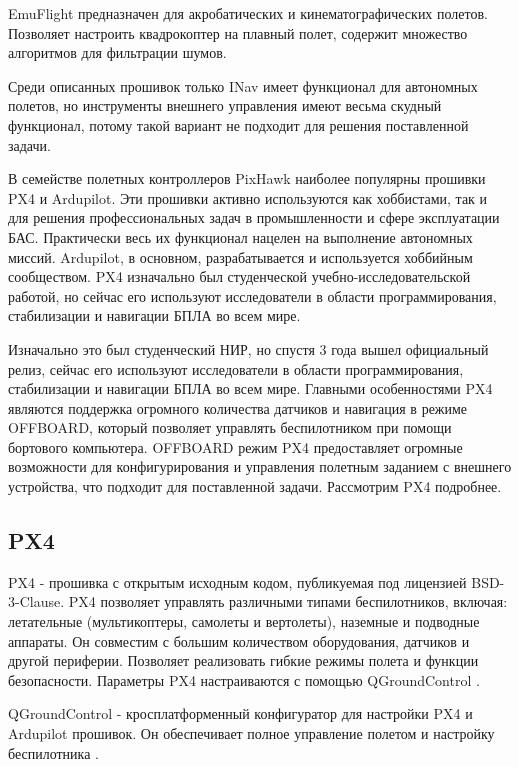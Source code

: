 EmuFlight предназначен для акробатических и кинематографических полетов. Позволяет настроить квадрокоптер на плавный полет, содержит множество алгоритмов для фильтрации шумов.

Среди описанных прошивок только INav имеет функционал для автономных полетов, но инструменты внешнего управления имеют весьма скудный функционал, потому такой вариант не подходит для решения поставленной задачи.

В семействе полетных контроллеров PixHawk наиболее популярны прошивки PX4 и Ardupilot. Эти прошивки активно используются как хоббистами, так и для решения профессиональных задач в промышленности и сфере эксплуатации БАС. Практически весь их функционал нацелен на выполнение автономных миссий. Ardupilot, в основном, разрабатывается и используется хоббийным сообществом. PX4 изначально был студенческой учебно-исследовательской работой, но сейчас его используют исследователи в области программирования, стабилизации и навигации БПЛА во всем мире.

Изначально это был студенческий НИР, но спустя 3 года вышел официальный релиз, сейчас его используют исследователи в области программирования, стабилизации и навигации БПЛА во всем мире. Главными особенностями PX4 являются поддержка огромного количества датчиков и навигация в режиме OFFBOARD, который позволяет управлять беспилотником при помощи бортового компьютера. OFFBOARD режим PX4 предоставляет огромные возможности для конфигурирования и управления полетным заданием с внешнего устройства, что подходит для поставленной задачи. Рассмотрим PX4 подробнее.

\subsection{PX4}

PX4 - прошивка с открытым исходным кодом, публикуемая под лицензией BSD-3-Clause. PX4 позволяет управлять различными типами беспилотников, включая: летательные (мультикоптеры, самолеты и вертолеты), наземные и подводные аппараты. Он совместим с большим количеством оборудования, датчиков и другой периферии. Позволяет реализовать гибкие режимы полета и функции безопасности.
Параметры PX4 настраиваются с помощью Q\-Ground\-Control \cite{px4}.

QGroundControl - кросплатформенный конфигуратор для настройки PX4 и Ardupilot прошивок. Он обеспечивает полное управление полетом и настройку беспилотника \cite{qgroundcontrol}.

